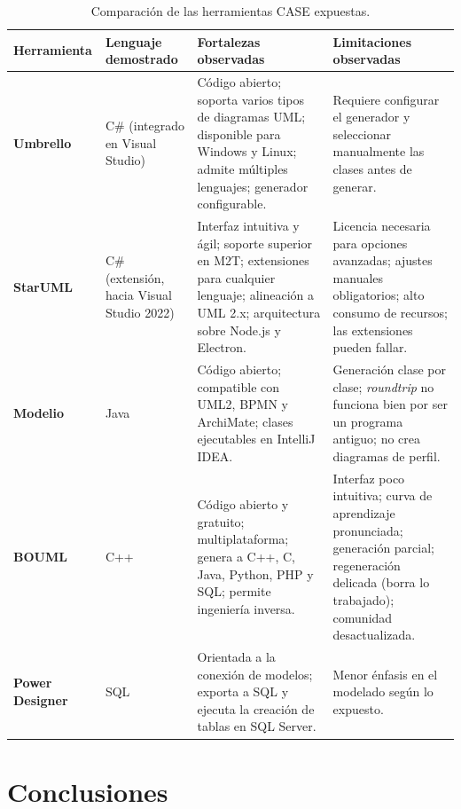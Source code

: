 \documentclass[journal,onecolumn]{IEEEtran}
\begin{document}
	\begin{table}[H]
		\caption{Comparación de las herramientas CASE expuestas.}
		\label{tab:comparativo}
		\centering
		\begin{tabularx}{\linewidth}{|L{2.2cm}|L{2.3cm}|X|X|}
			\hline
			\textbf{Herramienta} & \textbf{Lenguaje demostrado} & \textbf{Fortalezas observadas} & \textbf{Limitaciones observadas} \\
			\hline
			\textbf{Umbrello} & C\# (integrado en Visual Studio) & Código abierto; soporta varios tipos de diagramas UML; disponible para Windows y Linux; admite múltiples lenguajes; generador configurable. & Requiere configurar el generador y seleccionar manualmente las clases antes de generar. \\
			\hline
			\textbf{StarUML} & C\# (extensión, hacia Visual Studio 2022) & Interfaz intuitiva y ágil; soporte superior en M2T; extensiones para cualquier lenguaje; alineación a UML 2.x; arquitectura sobre Node.js y Electron. & Licencia necesaria para opciones avanzadas; ajustes manuales obligatorios; alto consumo de recursos; las extensiones pueden fallar. \\
			\hline
			\textbf{Modelio} & Java & Código abierto; compatible con UML2, BPMN y ArchiMate; clases ejecutables en IntelliJ IDEA. & Generación clase por clase; \textit{roundtrip} no funciona bien por ser un programa antiguo; no crea diagramas de perfil. \\
			\hline
			\textbf{BOUML} & C++ & Código abierto y gratuito; multiplataforma; genera a C++, C, Java, Python, PHP y SQL; permite ingeniería inversa. & Interfaz poco intuitiva; curva de aprendizaje pronunciada; generación parcial; regeneración delicada (borra lo trabajado); comunidad desactualizada. \\
			\hline
			\textbf{Power Designer} & SQL & Orientada a la conexión de modelos; exporta a SQL y ejecuta la creación de tablas en SQL Server. & Menor énfasis en el modelado según lo expuesto. \\
			\hline
		\end{tabularx}
	\end{table}
	
	\section{Conclusiones}
	
\end{document}
